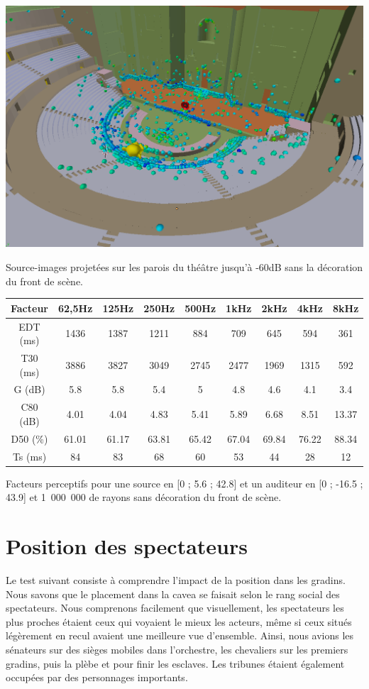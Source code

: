 \begin{figureth}
	\includegraphics[width=\linewidth]{images/SIsansDec}
	\caption{Source-images projetées sur les parois du théâtre jusqu'à -60dB sans la décoration du front de scène.}
	\label{SIsansDec}
\end{figureth}

\begin{tableth} 
 \begin{tabular}{| *{9}{c|}} 
 \hline 
 Facteur & 62,5Hz & 125Hz & 250Hz & 500Hz & 1kHz & 2kHz & 4kHz & 8kHz \\ 
 \hline 
 \hline 
\gls{EDT} (ms)& 1436& 1387& 1211& 884& 709& 645& 594& 361 \\ 
 \hline 
\gls{T30} (ms)& 3886& 3827& 3049& 2745& 2477& 1969& 1315& 592 \\ 
 \hline 
\gls{G} (dB)& 5.8& 5.8& 5.4& 5& 4.8& 4.6& 4.1& 3.4 \\ 
 \hline 
\gls{C80} (dB)& 4.01& 4.04& 4.83& 5.41& 5.89& 6.68& 8.51& 13.37 \\ 
 \hline 
\gls{D50} (\%)& 61.01& 61.17& 63.81& 65.42& 67.04& 69.84& 76.22& 88.34 \\ 
 \hline 
\gls{Ts} (ms)& 84& 83& 68& 60& 53& 44& 28& 12 \\ 
 \hline 
\end{tabular} 
 \caption{Facteurs perceptifs pour une source en [0 ; 5.6 ; 42.8] et un auditeur en [0 ; -16.5 ; 43.9] et 1~000~000 de rayons sans décoration du front de scène.} 
 \label{tab_fact_sansdec} 
 \end{tableth}


\section{Position des spectateurs} \label{sect_positionSpectateur}
Le test suivant consiste à comprendre l'impact de la position dans les gradins. Nous savons que le placement dans la \gls{cavea} se faisait selon le rang social des spectateurs. Nous comprenons facilement que visuellement, les spectateurs les plus proches étaient ceux qui voyaient le mieux les acteurs, même si ceux situés légèrement en recul avaient une meilleure vue d'ensemble. Ainsi, nous avions les sénateurs sur des sièges mobiles dans l'orchestre, les chevaliers sur les premiers gradins, puis la plèbe et pour finir les esclaves. Les tribunes étaient également occupées par des personnages importants.

